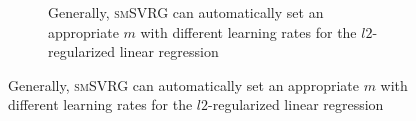 \documentclass[conference]{IEEEtran}
\begin{document}
\begin{itemize}
\begin{figure}[ht]
\begin{figure}[ht]
\caption{Generally, \textsc{smSVRG} can automatically set an appropriate $m$ with different learning rates for the $l2$-regularized linear regression}
\label{figure_linear_cadata}
\end{figure}





\end{figure}
\end{itemize}
\end{document}
